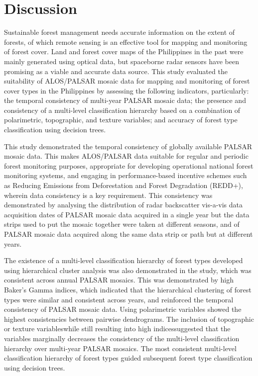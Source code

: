 
\chapter{Discussion}
\label{cha: discussion}

Sustainable forest management needs accurate information on the extent of forests, of which remote sensing is an effective tool for mapping and monitoring of forest cover. Land and forest cover maps of the Philippines in the past were mainly generated using optical data, but spaceborne radar sensors have been promising as a viable and accurate data source. This study evaluated the suitability of ALOS/PALSAR mosaic data for mapping and monitoring of forest cover types in the Philippines by assessing the following indicators, particularly: the temporal consistency of multi-year PALSAR mosaic data; the presence and consistency of a multi-level classification hierarchy based on a combination of polarimetric, topographic, and texture variables; and accuracy of forest type classification using decision trees.

This study demonstrated the temporal consistency of globally available PALSAR mosaic data. This makes ALOS/PALSAR data suitable for regular and periodic forest monitoring purposes, appropriate for developing operational national forest monitoring systems, and engaging in performance-based incentive schemes such as Reducing Emissions from Deforestation and Forest Degradation (REDD+), wherein data consistency is a key requirement. This consistency was demonstrated by analysing the distribution of radar backscatter vis-a-vis data acquisition dates of PALSAR mosaic data acquired in a single year but the data strips used to put the mosaic together were taken at different seasons, and of PALSAR mosaic data acquired along the same data strip or path but at different years.

The existence of a multi-level classification hierarchy of forest types developed using hierarchical cluster analysis was also demonstrated in the study, which was consistent across annual PALSAR mosaics. This was demonstrated by high Baker’s Gamma indices, which indicated that the hierarchical clustering of forest types were similar and consistent across years, and reinforced the temporal consistency of PALSAR mosaic data. Using polarimetric variables showed the highest consistencies between pairwise dendrograms. The inclusion of topographic or texture variables\textemdash{}while still resulting into high indices\textemdash{}suggested that the variables marginally decreases the consistency of the multi-level classification hierarchy over multi-year PALSAR mosaics. The most consistent multi-level classification hierarchy of forest types guided subsequent forest type classification using decision trees.


